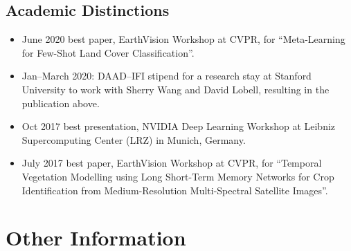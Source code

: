 \documentclass{scrartcl}
\begin{document}
\subsection*{Academic Distinctions}
\begin{itemize}
    \item June 2020 best paper, EarthVision Workshop at CVPR, for ``Meta-Learning for Few-Shot Land Cover Classification''.
    \item Jan--March 2020: DAAD--IFI stipend for a research stay at Stanford University to work with Sherry Wang and David Lobell, resulting in the publication above.
    \item Oct 2017 best presentation, NVIDIA Deep Learning Workshop at Leibniz Supercomputing Center (LRZ) in Munich, Germany.
    \item July 2017 best paper, EarthVision Workshop at CVPR, for ``Temporal Vegetation Modelling using Long Short-Term Memory Networks for Crop Identification from Medium-Resolution Multi-Spectral Satellite Images''.
\end{itemize}

\section*{Other Information}


\end{document}

